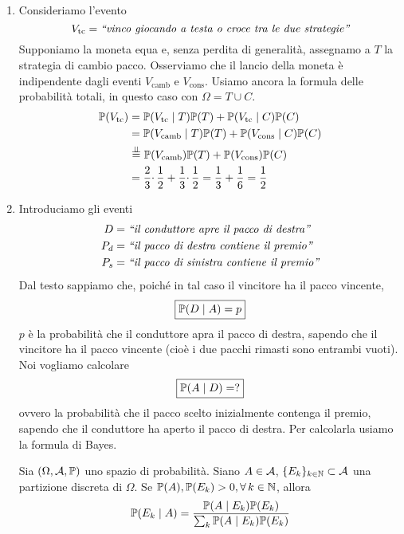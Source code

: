 \begin{enumerate}
	\item Consideriamo l'evento
	\begin{equation*}
		V_{\text{tc}} =\emph{``vinco giocando a testa o croce tra le due strategie''}
	\end{equation*}
	Supponiamo la moneta equa e, senza perdita di generalità, assegnamo a $T$ la strategia di cambio pacco. Osserviamo che il lancio della moneta è indipendente dagli eventi $V_{\text{camb}}$ e $V_{\text{cons}}$. Usiamo ancora la formula delle probabilità totali, in questo caso con $\Omega =T\cup C$.
	\begin{align*}
		\mathbb{P}(V_{\text{tc}}) & =\mathbb{P}(V_{\text{tc}} \mid T)\mathbb{P}(T) +\mathbb{P}(V_{\text{tc}} \mid C)\mathbb{P}(C) \\
		 & =\mathbb{P}(V_{\text{camb}} \mid T)\mathbb{P}(T) +\mathbb{P}(V_{\text{cons}} \mid C)\mathbb{P}(C) \\
		 & \overset{\perp \!\!\! \perp}{=} \mathbb{P}(V_{\text{camb}})\mathbb{P}(T) +\mathbb{P}(V_{\text{cons}})\mathbb{P}(C) \\
		 & =\frac{2}{3} \cdotp \frac{1}{2} +\frac{1}{3} \cdotp \frac{1}{2} =\frac{1}{3} +\frac{1}{6} =\frac{1}{2}
	\end{align*}
	\item Introduciamo gli eventi
	\begin{align*}
		D&=\emph{``il conduttore apre il pacco di destra''}\\
		P_{d} &=\emph{``il pacco di destra contiene il premio''}\\
		P_{s} &=\emph{``il pacco di sinistra contiene il premio''}
	\end{align*}
	Dal testo sappiamo che, poiché in tal caso il vincitore ha il pacco vincente,
	\begin{equation*}
		\boxed{\mathbb{P}(D\mid A) =p}
	\end{equation*}
	$p$ è la probabilità che il conduttore apra il pacco di destra, sapendo che il vincitore ha il pacco vincente (cioè i due pacchi rimasti sono entrambi vuoti). Noi vogliamo calcolare
	\begin{equation*}
		\boxed{\mathbb{P}(A\mid D) =?}
	\end{equation*}
	ovvero la probabilità che il pacco scelto inizialmente contenga il premio, sapendo che il conduttore ha aperto il pacco di destra. Per calcolarla usiamo la formula di Bayes.
	\begin{thm}
		Sia $(\Omega,\mathcal{A},\mathbb{P})$ uno spazio di probabilità. Siano $A\in \mathcal{A}$, $\{E_{k}\}_{k\in \mathbb{N}} \subset \mathcal{A}$ una partizione discreta di $\Omega $. Se $\PP(A) ,\PP(E_{k})  >0,\forall k\in \NN$, allora
		\begin{equation*}
			\mathbb{P}(E_{k} \mid A) =\frac{\mathbb{P}(A\mid E_{k})\mathbb{P}(E_{k})}{\sum_{k}\mathbb{P}(A\mid E_{k})\mathbb{P}(E_{k})}
		\end{equation*}
	\end{thm}


\end{enumerate}
